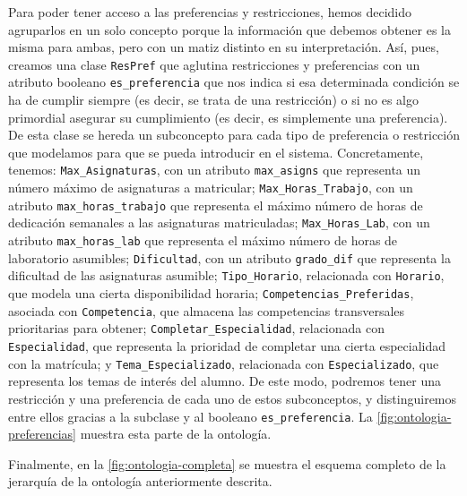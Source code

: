 Para poder tener acceso a las preferencias y restricciones, hemos decidido
agruparlos en un solo concepto porque la información que debemos obtener es
la misma para ambas, pero con un matiz distinto en su interpretación. Así, 
pues, creamos una clase \texttt{ResPref} que aglutina restricciones y 
preferencias con un atributo booleano \texttt{es\_preferencia} que nos indica 
si esa determinada condición se ha de cumplir siempre (es decir, se trata de 
una restricción) o si no es algo primordial asegurar su cumplimiento (es 
decir, es simplemente una preferencia). De esta clase se hereda un subconcepto 
para cada tipo de preferencia o restricción que modelamos para que se pueda 
introducir en el sistema. Concretamente, tenemos: \texttt{Max\_Asignaturas}, 
con un atributo \texttt{max\_asigns} que representa un número máximo de 
asignaturas a matricular; \texttt{Max\_Horas\_Trabajo}, con un atributo 
\texttt{max\_horas\_trabajo} que representa el máximo número de horas de 
dedicación semanales a las asignaturas matriculadas; \texttt{Max\_Horas\_Lab}, 
con un atributo \texttt{max\_horas\_lab} que representa el máximo número de 
horas de laboratorio asumibles; \texttt{Dificultad}, con un atributo 
\texttt{grado\_dif} que representa la dificultad de las asignaturas asumible;
\texttt{Tipo\_Horario}, relacionada con \texttt{Horario}, que modela una 
cierta disponibilidad horaria; \texttt{Competencias\_Preferidas}, asociada 
con \texttt{Competencia}, que almacena las competencias transversales 
prioritarias para obtener; \texttt{Completar\_Especialidad}, relacionada con 
\texttt{Especialidad}, que representa la prioridad de completar una cierta 
especialidad con la matrícula; y \texttt{Tema\_Especializado}, relacionada 
con \texttt{Especializado}, que representa los temas de interés del alumno.
De este modo, podremos tener una restricción y una preferencia de cada uno 
de estos subconceptos, y distinguiremos entre ellos gracias a la subclase y 
al booleano \texttt{es\_preferencia}. 
La \autoref{fig:ontologia-preferencias} muestra esta parte de la ontología.

Finalmente, en la \autoref{fig:ontologia-completa} se muestra el esquema 
completo de la jerarquía de la ontología anteriormente descrita.

